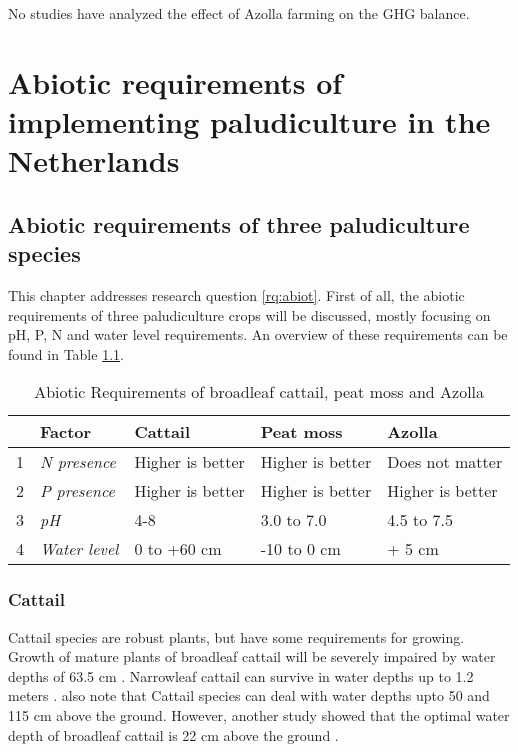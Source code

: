 \documentclass[a4paper,12pt]{scrbook}
\begin{document}
No studies have analyzed the effect of Azolla farming on the GHG balance. 

\chapter{Abiotic requirements of implementing paludiculture in the Netherlands} \label{ch:abiot}

\section{Abiotic requirements of three paludiculture species}

This chapter addresses research question \ref{rq:abiot}. First of all, the abiotic requirements of three paludiculture crops will be discussed, mostly focusing on pH, \ac{P}, \ac{N} and water level requirements. An overview of these requirements can be found in Table \ref{tab:phy}.

\begin{table}[htbp]
\caption{Abiotic Requirements of broadleaf cattail, peat moss and Azolla}
\begin{flushleft}
\begin{tabular}{|r|l|l|l|l|}
\hline
\multicolumn{1}{|l|}{} & \textbf{Factor} & \textbf{Cattail} & \textbf{Peat moss} & \textbf{Azolla} \\ \hline
1 & \textit{N presence} &  Higher is better & Higher is better & Does not matter \\ \hline
2 & \textit{P presence} & Higher is better & Higher is better & Higher is better \\ \hline
3 & \textit{pH} & 4-8 & 3.0 to 7.0 & 4.5 to 7.5 \\ \hline
4 & \textit{Water level} & 0 to +60 cm & -10 to 0 cm & + 5 cm \\ \hline
\end{tabular}
\end{flushleft}
\label{tab:phy}
\end{table}


\subsection{Cattail}


Cattail species are robust plants, but have some requirements for growing. Growth of mature plants of broadleaf cattail will be severely impaired by water depths of 63.5 cm \citep{morton1975cattails}. Narrowleaf cattail can survive in water depths up to 1.2 meters \citep{morton1975cattails}. \citet{dubbe1988production} also note that Cattail species can deal with water depths upto 50 and 115 cm above the ground. However, another study showed that the optimal water depth of broadleaf cattail is 22 cm above the ground \citep{grace1989effects}.
\end{document}
